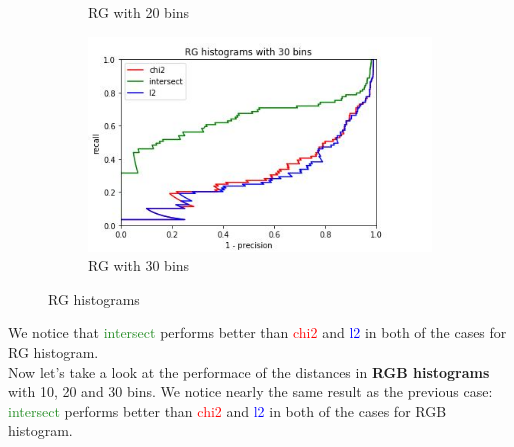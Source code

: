 \documentclass[
	12pt, %
]{fphw}
\begin{document}
\begin{figure}[h!]
\begin{subfigure}[b]{0.3\textwidth}
         \caption{RG with 20 bins}
         \label{fig:three sin x}
     \end{subfigure}
     \hfill
     \begin{subfigure}[b]{0.3\textwidth}
         \centering
         \includegraphics[width=\textwidth]{img/plots/RG_30.JPG}
         \caption{RG with 30 bins}
         \label{fig:five over x}
     \end{subfigure}
        \caption{RG histograms}
        \label{fig:three graphs}
\end{figure}
We notice that \textcolor{ForestGreen}{intersect} performs better than \textcolor{red}{chi2} and \textcolor{blue}{l2} in both of the cases for RG histogram.\\ 
Now let's take a look at the performace of the distances in \textbf{RGB histograms} with 10, 20 and 30 bins. We notice nearly the same result as the previous case: \textcolor{ForestGreen}{intersect} performs better than \textcolor{red}{chi2} and \textcolor{blue}{l2} in both of the cases for RGB histogram.\\
\end{document}

